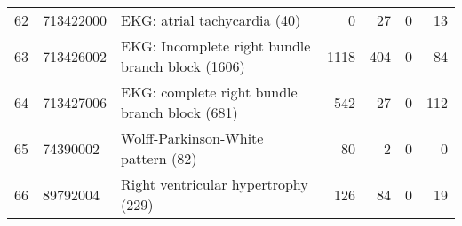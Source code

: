 \begin{tabular}{lllrrrr}
62 & 713422000 & EKG: atrial tachycardia (40) & {\cellcolor[HTML]{EBF3ED}} \color[HTML]{000000} 0 & {\cellcolor[HTML]{2E8B57}} \color[HTML]{F1F1F1} 27 & {\cellcolor[HTML]{EBF3ED}} \color[HTML]{000000} 0 & {\cellcolor[HTML]{90C1A5}} \color[HTML]{000000} 13 \\
63 & 713426002 & EKG: Incomplete right bundle branch block (1606) & {\cellcolor[HTML]{2E8B57}} \color[HTML]{F1F1F1} 1118 & {\cellcolor[HTML]{A7CDB7}} \color[HTML]{000000} 404 & {\cellcolor[HTML]{EBF3ED}} \color[HTML]{000000} 0 & {\cellcolor[HTML]{DDEBE2}} \color[HTML]{000000} 84 \\
64 & 713427006 & EKG: complete right bundle branch block (681) & {\cellcolor[HTML]{2E8B57}} \color[HTML]{F1F1F1} 542 & {\cellcolor[HTML]{E2EEE6}} \color[HTML]{000000} 27 & {\cellcolor[HTML]{EBF3ED}} \color[HTML]{000000} 0 & {\cellcolor[HTML]{C4DDCF}} \color[HTML]{000000} 112 \\
65 & 74390002 & Wolff-Parkinson-White pattern (82) & {\cellcolor[HTML]{2E8B57}} \color[HTML]{F1F1F1} 80 & {\cellcolor[HTML]{E7F0EA}} \color[HTML]{000000} 2 & {\cellcolor[HTML]{EBF3ED}} \color[HTML]{000000} 0 & {\cellcolor[HTML]{EBF3ED}} \color[HTML]{000000} 0 \\
66 & 89792004 & Right ventricular hypertrophy (229) & {\cellcolor[HTML]{2E8B57}} \color[HTML]{F1F1F1} 126 & {\cellcolor[HTML]{6DAE89}} \color[HTML]{F1F1F1} 84 & {\cellcolor[HTML]{EBF3ED}} \color[HTML]{000000} 0 & {\cellcolor[HTML]{CFE3D7}} \color[HTML]{000000} 19 \\
\end{tabular}
